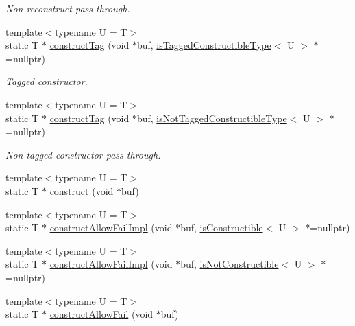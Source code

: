 \begin{DoxyCompactItemize}
\begin{DoxyCompactList}\small\item\em Non-\/reconstruct pass-\/through. \end{DoxyCompactList}\item 
{\footnotesize template$<$typename U  = T$>$ }\\static T $\ast$ \hyperlink{structcheckpoint_1_1dispatch_1_1_reconstructor_ac702decacef9a6ef4d0cf5492187b9ab}{construct\+Tag} (void $\ast$buf, \hyperlink{namespacecheckpoint_abff0f367c546c94ce857d200153d990f}{is\+Tagged\+Constructible\+Type}$<$ U $>$ $\ast$=nullptr)
\begin{DoxyCompactList}\small\item\em Tagged constructor. \end{DoxyCompactList}\item 
{\footnotesize template$<$typename U  = T$>$ }\\static T $\ast$ \hyperlink{structcheckpoint_1_1dispatch_1_1_reconstructor_a116025ae56a26ed4d6a51b999f57fd47}{construct\+Tag} (void $\ast$buf, \hyperlink{namespacecheckpoint_a4eb64ee16bff7ef1609e5b98cb16cfb6}{is\+Not\+Tagged\+Constructible\+Type}$<$ U $>$ $\ast$=nullptr)
\begin{DoxyCompactList}\small\item\em Non-\/tagged constructor pass-\/through. \end{DoxyCompactList}\item 
{\footnotesize template$<$typename U  = T$>$ }\\static T $\ast$ \hyperlink{structcheckpoint_1_1dispatch_1_1_reconstructor_a31a927731c0b265003a416e8d20616a1}{construct} (void $\ast$buf)
\item 
{\footnotesize template$<$typename U  = T$>$ }\\static T $\ast$ \hyperlink{structcheckpoint_1_1dispatch_1_1_reconstructor_ac4eac94cd715ae6637f5f5c52bb78584}{construct\+Allow\+Fail\+Impl} (void $\ast$buf, \hyperlink{namespacecheckpoint_a48ec2649d5cbd890f67ea1193cc0d51a}{is\+Constructible}$<$ U $>$ $\ast$=nullptr)
\item 
{\footnotesize template$<$typename U  = T$>$ }\\static T $\ast$ \hyperlink{structcheckpoint_1_1dispatch_1_1_reconstructor_a13e4fc01aaa73ef810d519a405f16264}{construct\+Allow\+Fail\+Impl} (void $\ast$buf, \hyperlink{namespacecheckpoint_a14b3c81988a2c2d3c935edcc653b6322}{is\+Not\+Constructible}$<$ U $>$ $\ast$=nullptr)
\item 
{\footnotesize template$<$typename U  = T$>$ }\\static T $\ast$ \hyperlink{structcheckpoint_1_1dispatch_1_1_reconstructor_afbfa29526948dda3d9d843a377f526fc}{construct\+Allow\+Fail} (void $\ast$buf)
\end{DoxyCompactItemize}


